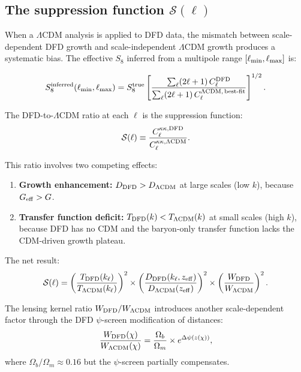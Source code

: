 \documentclass[11pt]{article}
\begin{document}
\subsection{The suppression function $\mathcal{S}(\ell)$}

When a $\Lambda$CDM analysis is applied to DFD data, the mismatch between scale-dependent DFD growth and scale-independent $\Lambda$CDM growth produces a systematic bias. The effective $S_8$ inferred from a multipole range $[\ell_{\rm min}, \ell_{\rm max}]$ is:

\begin{equation}
S_8^{\rm inferred}(\ell_{\rm min}, \ell_{\rm max}) = S_8^{\rm true}\left[\frac{\sum_\ell (2\ell+1)\,C_\ell^{\rm DFD}}{\sum_\ell (2\ell+1)\,C_\ell^{\Lambda\rm CDM,\,best\text{-}fit}}\right]^{1/2}.
\end{equation}

The DFD-to-$\Lambda$CDM ratio at each $\ell$ is the suppression function:
\begin{equation}\label{eq:suppression}
\mathcal{S}(\ell) \equiv \frac{C_\ell^{\kappa\kappa,\rm DFD}}{C_\ell^{\kappa\kappa,\Lambda\rm CDM}}.
\end{equation}

This ratio involves two competing effects:
\begin{enumerate}
\item \textbf{Growth enhancement:} $D_{\rm DFD} > D_{\Lambda\rm CDM}$ at large scales (low $k$), because $G_{\rm eff} > G$.
\item \textbf{Transfer function deficit:} $T_{\rm DFD}(k) < T_{\Lambda\rm CDM}(k)$ at small scales (high $k$), because DFD has no CDM and the baryon-only transfer function lacks the CDM-driven growth plateau.
\end{enumerate}

The net result:
\begin{equation}
\mathcal{S}(\ell) = \left(\frac{T_{\rm DFD}(k_\ell)}{T_{\Lambda\rm CDM}(k_\ell)}\right)^2 \times \left(\frac{D_{\rm DFD}(k_\ell, z_{\rm eff})}{D_{\Lambda\rm CDM}(z_{\rm eff})}\right)^2 \times \left(\frac{W_{\rm DFD}}{W_{\Lambda\rm CDM}}\right)^2.
\end{equation}

The lensing kernel ratio $W_{\rm DFD}/W_{\Lambda\rm CDM}$ introduces another scale-dependent factor through the DFD $\psi$-screen modification of distances:
\begin{equation}
\frac{W_{\rm DFD}(\chi)}{W_{\Lambda\rm CDM}(\chi)} = \frac{\Omega_b}{\Omega_m} \times e^{\Delta\psi(z(\chi))},
\end{equation}
where $\Omega_b/\Omega_m \approx 0.16$ but the $\psi$-screen partially compensates.
\end{document}
